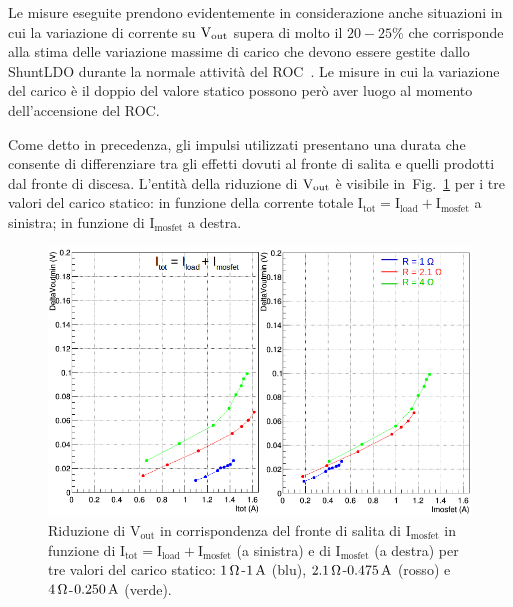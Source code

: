 Le misure eseguite prendono evidentemente in considerazione anche situazioni in cui la variazione di corrente su $\mathrm{V_{out}}$ supera di molto il $20-25\%$ che corrisponde alla stima delle  variazione massime di carico che devono essere gestite dallo ShuntLDO durante la normale attivit\`a del ROC~\cite{saramarconi}. Le misure in cui la variazione del carico è il doppio del valore statico possono per\`o aver luogo al momento dell'accensione del ROC.

Come detto in precedenza, gli impulsi utilizzati presentano una durata che consente di differenziare tra gli effetti dovuti al fronte di salita e quelli prodotti dal fronte di discesa. 
L'entit\`a della riduzione di $\mathrm{V_{out}}$ \`e visibile in~Fig.~\ref{VoutUnd} per i tre valori del carico statico: in funzione della corrente totale $\mathrm{I_{tot} = I_{load}+I_{mosfet}}$ a sinistra; in funzione di $\mathrm{I_{mosfet}}$ a destra. 
\begin{figure}
\centering
\includegraphics[width=0.9\linewidth]{Immagini/VoutUnd}
\caption{Riduzione di $\mathrm{V_{out}}$ in corrispondenza del fronte di salita di $\mathrm{I_{mosfet}}$ in funzione di $\mathrm{I_{tot} = I_{load}+I_{mosfet}}$ (a sinistra) e di $\mathrm{I_{mosfet}}$ (a destra) per tre valori del carico statico: $1{\rm \, \Omega}$-$1\rm \, A$ (blu), $2.1{\rm \, \Omega}$-$0.475\rm \, A$ (rosso) e $4{\rm \, \Omega}$-$0.250\rm \, A$ (verde).}
\label{VoutUnd}
\end{figure}
